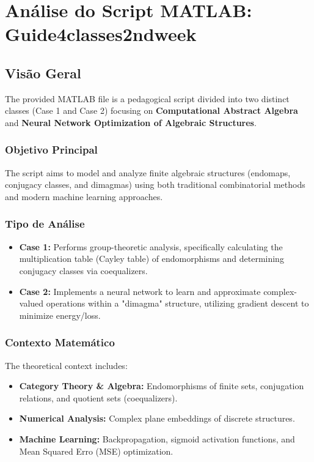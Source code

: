 \chapter{Análise do Script MATLAB: Guide4classes2ndweek}

\section{Visão Geral}
The provided MATLAB file is a pedagogical script divided into two distinct classes (Case 1 and Case 2) focusing on \textbf{Computational Abstract Algebra} and \textbf{Neural Network Optimization of Algebraic Structures}.

\subsection{Objetivo Principal}
The script aims to model and analyze finite algebraic structures (endomaps, conjugacy classes, and dimagmas) using both traditional combinatorial methods and modern machine learning approaches.

\subsection{Tipo de Análise}
\begin{itemize}
    \item \textbf{Case 1:} Performs group-theoretic analysis, specifically calculating the multiplication table (Cayley table) of endomorphisms and determining conjugacy classes via coequalizers.
    \item \textbf{Case 2:} Implements a neural network to learn and approximate complex-valued operations within a "dimagma" structure, utilizing gradient descent to minimize energy/loss.
\end{itemize}

\subsection{Contexto Matemático}
The theoretical context includes:
\begin{itemize}
    \item \textbf{Category Theory \& Algebra:} Endomorphisms of finite sets, conjugation relations, and quotient sets (coequalizers).
    \item \textbf{Numerical Analysis:} Complex plane embeddings of discrete structures.
    \item \textbf{Machine Learning:} Backpropagation, sigmoid activation functions, and Mean Squared Erro (MSE) optimization.
\end{itemize}


